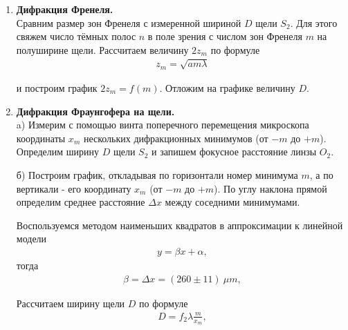 \begin{enumerate}

    \item 
    
    \textbf{Дифракция Френеля.}\\
    
    Сравним размер зон Френеля с измеренной шириной $D$ щели $S_2$. Для этого свяжем число тёмных полос $n$ в поле зрения с числом зон Френеля $m$ на полуширине щели. Рассчитаем величину $2 z_m$ по формуле
    \begin{gather*}
        z_m = \sqrt{a m \lambda}
    \end{gather*}
    
    и построим график $2 z_m = f(m)$. Отложим на графике величину $D$. 
    
    \begin{figure}[h]
    \end{figure}
    
    \item 

    \textbf{Дифракция Фраунгофера на щели.}\\
    
    a)  Измерим с помощью винта поперечного перемещения микроскопа координаты $x_m$ нескольких дифракционных минимумов (от $-m$ до $+m$). Определим ширину $D$ щели $S_2$ и запишем фокусное расстояние линзы $O_2$.
    
    б) Построим график, откладывая по горизонтали номер минимума $m$, а по вертикали - его координату $x_m$ (от $-m$ до $+m$). По углу наклона прямой определим среднее расстояние $\Delta x$ между соседними минимумами. 
    
    \begin{figure}[h]
    \end{figure}
    
    Воспользуемся методом наименьших квадратов в аппроксимации к линейной модели
    \begin{gather*}
        y = \beta x + \alpha,
    \end{gather*}
    тогда
    \begin{gather*}
        \beta = \Delta x = (260 \pm 11)~\mu m,
    \end{gather*}
    
    Рассчитаем ширину щели $D$ по формуле
    \begin{gather*}
        D = f_2 \lambda \frac{m}{x_m},
    \end{gather*}
    

\end{enumerate}
